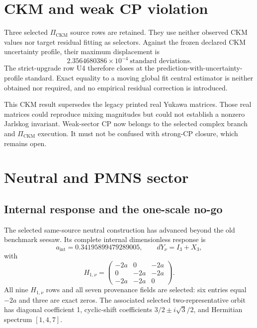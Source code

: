 \documentclass[11pt]{article}
\begin{document}
\section{CKM and weak CP violation}

Three selected $\Pi_{\mathrm{CKM}}$ source rows are retained. They use neither
observed CKM values nor target residual fitting as selectors. Against the
frozen declared CKM uncertainty profile, their maximum displacement is
\begin{equation}
2.3564680386\times10^{-4}\ \text{standard deviations}.
\end{equation}
The strict-upgrade row U4 therefore closes at the
prediction-with-uncertainty-profile standard. Exact equality to a moving global
fit central estimator is neither obtained nor required, and no empirical
residual correction is introduced.

This CKM result supersedes the legacy printed real Yukawa matrices. Those real
matrices could reproduce mixing magnitudes but could not establish a nonzero
Jarlskog invariant. Weak-sector CP now belongs to the selected complex branch
and $\Pi_{\mathrm{CKM}}$ execution. It must not be confused with strong-CP
closure, which remains open.

\section{Neutral and PMNS sector}

\subsection{Internal response and the one-scale no-go}

The selected same-source neutral construction has advanced beyond the old
benchmark seesaw. Its complete internal dimensionless response is
\begin{equation}
a_{\mathrm{int}}=0.34195899479289005,
\qquad dY_\nu=I_3+X_3,
\end{equation}
with
\begin{equation}
H_{1,\nu}=
\begin{pmatrix}
-2a&0&-2a\\
0&-2a&-2a\\
-2a&-2a&0
\end{pmatrix}.
\end{equation}
All nine $H_{1,\nu}$ rows and all seven provenance fields are selected: six
entries equal $-2a$ and three are exact zeros. The associated selected
two-representative orbit has diagonal coefficient 1, cyclic-shift coefficients
$3/2\pm i\sqrt3/2$, and Hermitian spectrum $[1,4,7]$.
\end{document}
